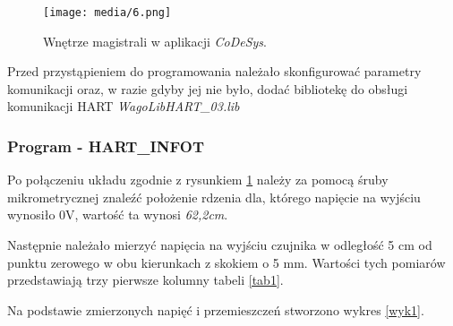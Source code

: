 \documentclass{article}
\begin{document}
\vspace{1em}
\begin{figure}[ht]
    \centering
    \texttt{[image: media/6.png]}
    \caption{Wnętrze magistrali w aplikacji \textit{CoDeSys}.}
    \label{fig1}
\end{figure}

Przed przystąpieniem do programowania należało skonfigurować parametry komunikacji oraz, w razie gdyby jej nie było, dodać bibliotekę do obsługi komunikacji HART \textit{WagoLibHART\_03.lib}
\newpage


\subsubsection{Program - HART\_INFOT} \label{1a}
Po połączeniu układu zgodnie z rysunkiem \ref{fig1} należy za pomocą śruby mikrometrycznej znaleźć położenie rdzenia dla, którego napięcie na wyjściu wynosiło 0V, wartość ta wynosi \textit{62,2cm}. 



Następnie należało mierzyć napięcia na wyjściu czujnika w odległość 5 cm od punktu zerowego w obu kierunkach z skokiem o 5 mm. Wartości tych pomiarów przedstawiają trzy pierwsze kolumny tabeli \ref{tab1}.

Na podstawie zmierzonych napięć i przemieszczeń stworzono wykres \ref{wyk1}.
\end{document}
